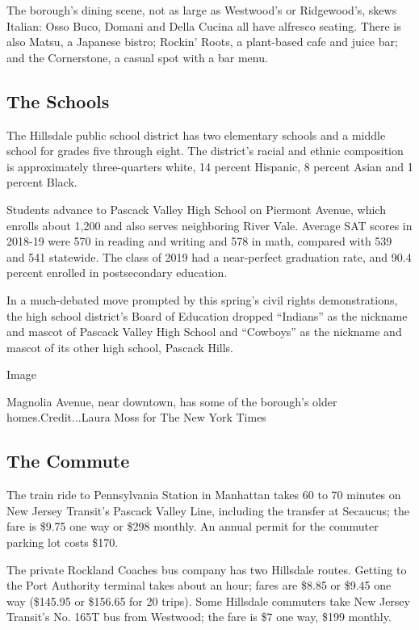 The borough's dining scene, not as large as Westwood's or Ridgewood's,
skews Italian: Osso Buco, Domani and Della Cucina all have alfresco
seating. There is also Matsu, a Japanese bistro; Rockin' Roots, a
plant-based cafe and juice bar; and the Cornerstone, a casual spot with
a bar menu.

\hypertarget{the-schools}{%
\subsection{The Schools}\label{the-schools}}

The Hillsdale public school district has two elementary schools and a
middle school for grades five through eight. The district's racial and
ethnic composition is approximately three-quarters white, 14 percent
Hispanic, 8 percent Asian and 1 percent Black.

Students advance to Pascack Valley High School on Piermont Avenue, which
enrolls about 1,200 and also serves neighboring River Vale. Average SAT
scores in 2018-19 were 570 in reading and writing and 578 in math,
compared with 539 and 541 statewide. The class of 2019 had a
near-perfect graduation rate, and 90.4 percent enrolled in postsecondary
education.

In a much-debated move prompted by this spring's civil rights
demonstrations, the high school district's Board of Education dropped
``Indians'' as the nickname and mascot of Pascack Valley High School and
``Cowboys'' as the nickname and mascot of its other high school, Pascack
Hills.

Image

Magnolia Avenue, near downtown, has some of the borough's older
homes.Credit...Laura Moss for The New York Times

\hypertarget{the-commute}{%
\subsection{The Commute}\label{the-commute}}

The train ride to Pennsylvania Station in Manhattan takes 60 to 70
minutes on New Jersey Transit's Pascack Valley Line, including the
transfer at Secaucus; the fare is \$9.75 one way or \$298 monthly. An
annual permit for the commuter parking lot costs \$170.

The private Rockland Coaches bus company has two Hillsdale routes.
Getting to the Port Authority terminal takes about an hour; fares are
\$8.85 or \$9.45 one way (\$145.95 or \$156.65 for 20 trips). Some
Hillsdale commuters take New Jersey Transit's No. 165T bus from
Westwood; the fare is \$7 one way, \$199 monthly.

